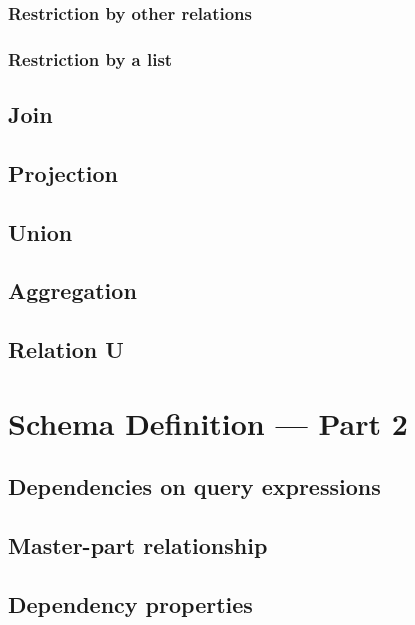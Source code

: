 \documentclass[letter,twocolumn,11pt]{article}
\begin{document}
\subsubsection{Restriction by other relations}
\subsubsection{Restriction by a list}

\subsection{Join}
\subsection{Projection}
\subsection{Union}
\subsection{Aggregation}
\subsection{Relation U}

\section{Schema Definition --- Part 2}
\subsection{Dependencies on query expressions}
\subsection{Master-part relationship}
\subsection{Dependency properties}



\end{document}
